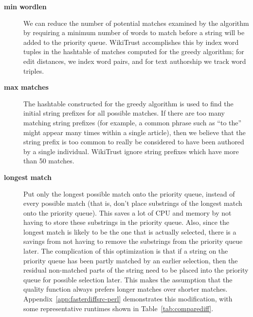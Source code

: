 
\begin{description}
\item[\textbf{min wordlen}] 
    We can reduce the number of potential matches examined
    by the algorithm by requiring a minimum number of words to match
    before a string will be added to the priority queue.
    WikiTrust accomplishes this by index word tuples in the
    hashtable of matches computed for the greedy algorithm;
    for edit distances, we index word pairs, and for text authorship
    we track word triples.

\item[\textbf{max matches}]
    The hashtable constructed for the greedy algorithm is used
    to find the initial string prefixes for all possible matches.
    If there are too many matching string prefixes (for example,
    a common phrase such as ``to the'' might appear many times
    within a single article), then we believe that the string prefix
    is too common to really be considered to have been authored
    by a single individual.
    WikiTrust ignore string prefixes which have more than 50 matches.

\item[\textbf{longest match}] Put only the longest possible match
    onto the priority queue, instead of every possible match (that is, don't
    place substrings of the longest match onto the priority queue).
    This saves a lot of CPU and memory by not having to store
    these substrings in the priority queue.
    Also, since the longest match is likely to be the one that is
    actually selected, there is a savings from not having to remove
    the substrings from the priority queue later.
    The complication of this optimization is that if a string on
    the priority queue has been partly matched by an earlier selection,
    then the residual non-matched parts of the string need to
    be placed into the priority queue for possible selection later.
    This makes the assumption that the quality function always
    prefers longer matches over shorter matches.
    Appendix~\ref{app:fasterdiffsrc-perl} demonstrates this
    modification, with some representative runtimes shown
    in Table~\ref{tab:comparediff}.


\end{description}
